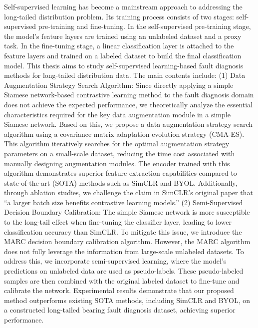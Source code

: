 \documentclass[master]{thesis-uestc}
\begin{document}
\begin{englishabstract}
    Self-supervised learning has become a mainstream approach to addressing the long-tailed distribution problem. Its training process consists of two stages: self-supervised pre-training and fine-tuning. In the self-supervised pre-training stage, the model’s feature layers are trained using an unlabeled dataset and a proxy task. In the fine-tuning stage, a linear classification layer is attached to the feature layers and trained on a labeled dataset to build the final classification model.
This thesis aims to study self-supervised learning-based fault diagnosis methods for long-tailed distribution data. The main contents include:
(1) Data Augmentation Strategy Search Algorithm: Since directly applying a simple Siamese network-based contrastive learning method to the fault diagnosis domain does not achieve the expected performance, we theoretically analyze the essential characteristics required for the key data augmentation module in a simple Siamese network. Based on this, we propose a data augmentation strategy search algorithm using a covariance matrix adaptation evolution strategy (CMA-ES). This algorithm iteratively searches for the optimal augmentation strategy parameters on a small-scale dataset, reducing the time cost associated with manually designing augmentation modules. The encoder trained with this algorithm demonstrates superior feature extraction capabilities compared to state-of-the-art (SOTA) methods such as SimCLR and BYOL. Additionally, through ablation studies, we challenge the claim in SimCLR’s original paper that “a larger batch size benefits contrastive learning models.”
(2) Semi-Supervised Decision Boundary Calibration: The simple Siamese network is more susceptible to the long-tail effect when fine-tuning the classifier layer, leading to lower classification accuracy than SimCLR. To mitigate this issue, we introduce the MARC decision boundary calibration algorithm. However, the MARC algorithm does not fully leverage the information from large-scale unlabeled datasets. To address this, we incorporate semi-supervised learning, where the model's predictions on unlabeled data are used as pseudo-labels. These pseudo-labeled samples are then combined with the original labeled dataset to fine-tune and calibrate the network.
Experimental results demonstrate that our proposed method outperforms existing SOTA methods, including SimCLR and BYOL, on a constructed long-tailed bearing fault diagnosis dataset, achieving superior performance.

\end{englishabstract}
\end{document}
